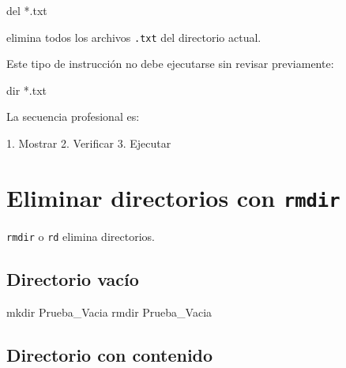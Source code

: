 \documentclass[
  spanish,
  letterpaper,
]{scrbook}
\newenvironment{Shaded}{\begin{snugshade}}{\end{snugshade}}
\newcommand{\BuiltInTok}[1]{\textcolor[rgb]{0.00,0.23,0.31}{#1}}
\newcommand{\NormalTok}[1]{\textcolor[rgb]{0.00,0.23,0.31}{#1}}
\begin{document}
\begin{Shaded}
\begin{Highlighting}[]
\BuiltInTok{del}\NormalTok{ *.txt}
\end{Highlighting}
\end{Shaded}

elimina todos los archivos \texttt{.txt} del directorio actual.

Este tipo de instrucción no debe ejecutarse sin revisar previamente:

\begin{Shaded}
\begin{Highlighting}[]
\BuiltInTok{dir}\NormalTok{ *.txt}
\end{Highlighting}
\end{Shaded}

La secuencia profesional es:

\begin{Shaded}
\begin{Highlighting}[]
\NormalTok{1. Mostrar}
\NormalTok{2. Verificar}
\NormalTok{3. Ejecutar}
\end{Highlighting}
\end{Shaded}


\chapter{\texorpdfstring{Eliminar directorios con
\texttt{rmdir}}{Eliminar directorios con rmdir}}\label{eliminar-directorios-con-rmdir}

\texttt{rmdir} o \texttt{rd} elimina directorios.

\section{Directorio vacío}\label{directorio-vacuxedo}

\begin{Shaded}
\begin{Highlighting}[]
\BuiltInTok{mkdir}\NormalTok{ Prueba\_Vacia}
\BuiltInTok{rmdir}\NormalTok{ Prueba\_Vacia}
\end{Highlighting}
\end{Shaded}

\section{Directorio con contenido}\label{directorio-con-contenido}
\end{document}

